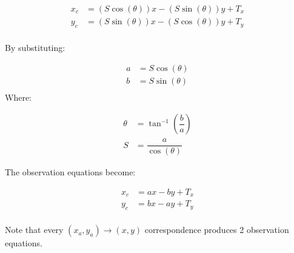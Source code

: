 \begin{align*}
x_c &= (S\cos(\theta))x - (S\sin(\theta))y + T_x \\
y_c &= (S\sin(\theta))x - (S\cos(\theta))y + T_y \\
\end{align*}

By substituting: 

\begin{align*}
	a &= S\cos(\theta) \\
	b &= S\sin(\theta) \\
\end{align*}
Where:

\begin{align*}
	\theta &= \tan^{-1}(\dfrac{b}{a}) \\
	S &= \dfrac{a}{\cos(\theta)}
\end{align*}

The observation equations become:

\begin{align*}
	x_c &= ax - by + T_x \\
	y_c &= bx - ay + T_y \\
\end{align*}

Note that every $(x_a,y_a)\rightarrow(x,y)$ correspondence produces 2 observation equations.

